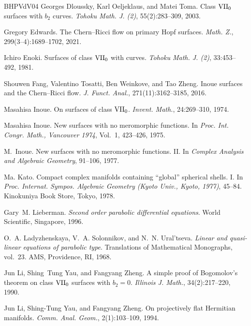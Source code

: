 \documentclass[12pt]{amsart}
\numberwithin{equation}{section}
\theoremstyle{remark}
\theoremstyle{definition}
\begin{document}
\begin{thebibliography}{BHPVdV04}
Georges Dloussky, Karl Oeljeklaus, and Matei Toma.
\newblock Class ${\rm VII}_0$ surfaces with $b_2$ curves.
\newblock \emph{Tohoku Math. J. (2)}, 55(2):283--309, 2003.

Gregory Edwards.
\newblock The Chern--Ricci flow on primary Hopf surfaces.
\newblock \emph{Math. Z.}, 299(3--4):1689--1702, 2021.

Ichiro Enoki.
\newblock Surfaces of class ${\rm VII}_0$ with curves.
\newblock \emph{Tohoku Math. J. (2)}, 33:453--492, 1981.

Shouwen Fang, Valentino Tosatti, Ben Weinkove, and Tao Zheng.
\newblock Inoue surfaces and the Chern--Ricci flow.
\newblock \emph{J. Funct. Anal.}, 271(11):3162--3185, 2016.

Masahisa Inoue.
\newblock On surfaces of class ${\rm VII}_0$.
\newblock \emph{Invent. Math.}, 24:269--310, 1974.

Masahisa Inoue.
\newblock New surfaces with no meromorphic functions.
\newblock In \emph{Proc. Int. Congr. Math., Vancouver 1974}, Vol.~1, 423--426, 1975.

M.~Inoue.
\newblock New surfaces with no meromorphic functions. II.
\newblock In \emph{Complex Analysis and Algebraic Geometry}, 91--106, 1977.

Ma. Kato.
\newblock Compact complex manifolds containing ``global'' spherical shells. I.
\newblock In \emph{Proc. Internat. Sympos. Algebraic Geometry (Kyoto Univ., Kyoto, 1977)}, 45--84. Kinokuniya Book Store, Tokyo, 1978.

Gary~M. Lieberman.
\newblock \emph{Second order parabolic differential equations}.
\newblock World Scientific, Singapore, 1996.

O.~A. Ladyzhenskaya, V.~A. Solonnikov, and N.~N. Ural'tseva.
\newblock \emph{Linear and quasi-linear equations of parabolic type}.
\newblock Translations of Mathematical Monographs, vol.~23. AMS, Providence, RI, 1968.

Jun Li, Shing~Tung Yau, and Fangyang Zheng.
\newblock A simple proof of Bogomolov's theorem on class ${\rm VII}_0$ surfaces with $b_2=0$.
\newblock \emph{Illinois J. Math.}, 34(2):217--220, 1990.

Jun Li, Shing-Tung Yau, and Fangyang Zheng.
\newblock On projectively flat Hermitian manifolds.
\newblock \emph{Comm. Anal. Geom.}, 2(1):103--109, 1994.


\end{thebibliography}
\end{document}
